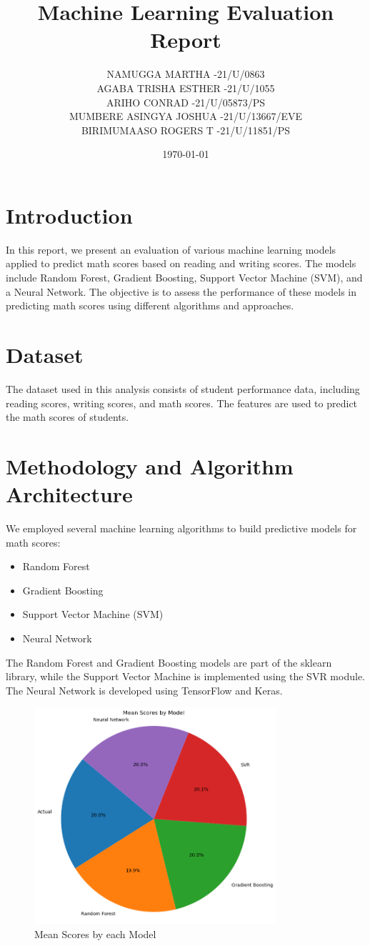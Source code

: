 \documentclass{article}
\title{Machine Learning Evaluation Report}
\author{NAMUGGA MARTHA  -21/U/0863 \\ 
AGABA TRISHA ESTHER  -21/U/1055 \\ 
ARIHO CONRAD  -21/U/05873/PS \\
MUMBERE ASINGYA JOSHUA  -21/U/13667/EVE \\
BIRIMUMAASO ROGERS T  -21/U/11851/PS}
\date{\today}
\begin{document}
\maketitle

\section{Introduction}
In this report, we present an evaluation of various machine learning models applied to predict math scores based on reading and writing scores. The models include Random Forest, Gradient Boosting, Support Vector Machine (SVM), and a Neural Network. The objective is to assess the performance of these models in predicting math scores using different algorithms and approaches.

\section{Dataset}
The dataset used in this analysis consists of student performance data, including reading scores, writing scores, and math scores. The features are used to predict the math scores of students.

\section{Methodology and Algorithm Architecture}
We employed several machine learning algorithms to build predictive models for math scores:
\begin{itemize}
\item Random Forest
\item Gradient Boosting
\item Support Vector Machine (SVM)
\item Neural Network
\end{itemize}

The Random Forest and Gradient Boosting models are part of the sklearn library, while the Support Vector Machine is implemented using the SVR module. The Neural Network is developed using TensorFlow and Keras.

\begin{figure}[H]
\centering
\includegraphics[width=0.8\textwidth]{algorithm_architecture.png}
\caption{Mean Scores by each Model}
\label{fig:algorithm_architecture}
\end{figure}
\end{document}
